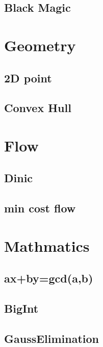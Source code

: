 \subsection{Black Magic}


\section{Geometry}

\subsection{2D point}

\subsection{Convex Hull}


\section{Flow}

\subsection{Dinic}

\subsection{min cost flow}


\section{Mathmatics}

\subsection{ax+by=gcd(a,b)}

\subsection{BigInt}

\subsection{GaussElimination}

